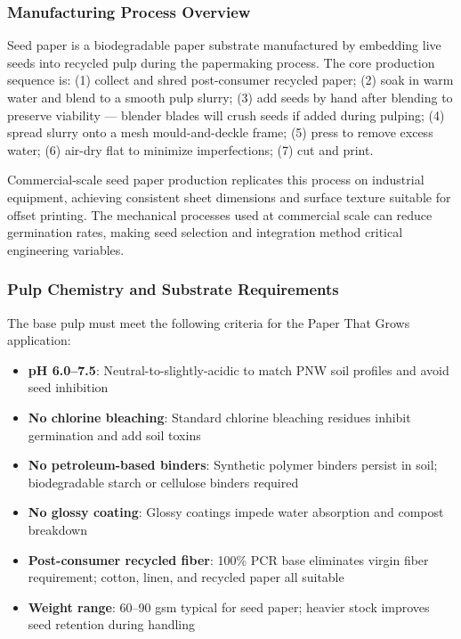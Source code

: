 \documentclass[11pt,letterpaper]{article}
\begin{document}
\subsubsection{Manufacturing Process Overview}
Seed paper is a biodegradable paper substrate manufactured by embedding live seeds into recycled pulp during the papermaking process. The core production sequence is: (1) collect and shred post-consumer recycled paper; (2) soak in warm water and blend to a smooth pulp slurry; (3) add seeds by hand after blending to preserve viability --- blender blades will crush seeds if added during pulping; (4) spread slurry onto a mesh mould-and-deckle frame; (5) press to remove excess water; (6) air-dry flat to minimize imperfections; (7) cut and print.

Commercial-scale seed paper production replicates this process on industrial equipment, achieving consistent sheet dimensions and surface texture suitable for offset printing. The mechanical processes used at commercial scale can reduce germination rates, making seed selection and integration method critical engineering variables.

\subsubsection{Pulp Chemistry and Substrate Requirements}
The base pulp must meet the following criteria for the Paper That Grows application:
\begin{itemize}[leftmargin=1.5em]
  \item \textbf{pH 6.0--7.5}: Neutral-to-slightly-acidic to match PNW soil profiles and avoid seed inhibition
  \item \textbf{No chlorine bleaching}: Standard chlorine bleaching residues inhibit germination and add soil toxins
  \item \textbf{No petroleum-based binders}: Synthetic polymer binders persist in soil; biodegradable starch or cellulose binders required
  \item \textbf{No glossy coating}: Glossy coatings impede water absorption and compost breakdown
  \item \textbf{Post-consumer recycled fiber}: 100\% PCR base eliminates virgin fiber requirement; cotton, linen, and recycled paper all suitable
  \item \textbf{Weight range}: 60--90 gsm typical for seed paper; heavier stock improves seed retention during handling
\end{itemize}
\end{document}
